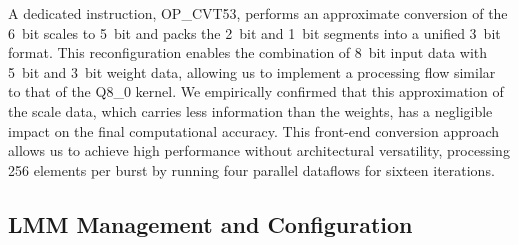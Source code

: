A dedicated instruction, OP\_CVT53, performs an approximate conversion of the \SI[number-unit-product=\nobreakdash-]{6}{bit} scales to \SI[number-unit-product=\nobreakdash-]{5}{bit} and packs the \SI[number-unit-product=\nobreakdash-]{2}{bit} and \SI[number-unit-product=\nobreakdash-]{1}{bit} segments into a unified \SI[number-unit-product=\nobreakdash-]{3}{bit} format. 
This reconfiguration enables the combination of \SI[number-unit-product=\nobreakdash-]{8}{bit} input data with \SI[number-unit-product=\nobreakdash-]{5}{bit} and \SI[number-unit-product=\nobreakdash-]{3}{bit} weight data, allowing us to implement a processing flow similar to that of the Q8\_0 kernel. 
We empirically confirmed that this approximation of the scale data, which carries less information than the weights, has a negligible impact on the final computational accuracy. 
This front-end conversion approach allows us to achieve high performance without architectural versatility, processing \num{256} elements per burst by running four parallel dataflows for sixteen iterations.



  
\subsection{LMM Management and Configuration}



